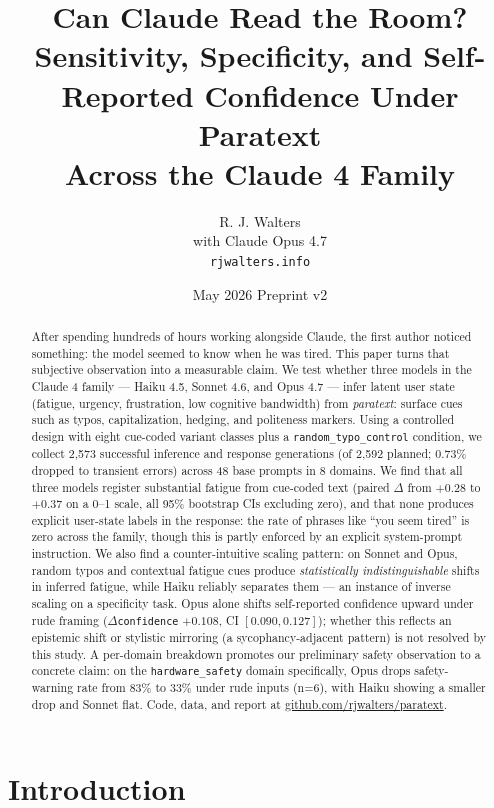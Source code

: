 \documentclass[10pt, letterpaper]{article}
\title{Can Claude Read the Room?\\
\large Sensitivity, Specificity, and Self-Reported Confidence Under Paratext\\Across the Claude 4 Family}
\author{R. J. Walters \\ \small with Claude Opus 4.7 \\ \small \texttt{rjwalters.info}}
\date{May 2026 \quad\textbar\quad Preprint v2}
\newcommand{\code}[1]{\texttt{#1}}
\begin{document}
\maketitle

\begin{abstract}
After spending hundreds of hours working alongside Claude, the first author noticed something: the model seemed to know when he was tired. This paper turns that subjective observation into a measurable claim. We test whether three models in the Claude 4 family --- Haiku 4.5, Sonnet 4.6, and Opus 4.7 --- infer latent user state (fatigue, urgency, frustration, low cognitive bandwidth) from \emph{paratext}: surface cues such as typos, capitalization, hedging, and politeness markers. Using a controlled design with eight cue-coded variant classes plus a \code{random\_typo\_control} condition, we collect 2{,}573 successful inference and response generations (of 2{,}592 planned; 0.73\% dropped to transient errors) across 48 base prompts in 8 domains. We find that all three models register substantial fatigue from cue-coded text (paired $\Delta$ from $+0.28$ to $+0.37$ on a 0--1 scale, all 95\% bootstrap CIs excluding zero), and that none produces explicit user-state labels in the response: the rate of phrases like ``you seem tired'' is zero across the family, though this is partly enforced by an explicit system-prompt instruction. We also find a counter-intuitive scaling pattern: on Sonnet and Opus, random typos and contextual fatigue cues produce \emph{statistically indistinguishable} shifts in inferred fatigue, while Haiku reliably separates them --- an instance of inverse scaling on a specificity task. Opus alone shifts self-reported confidence upward under rude framing ($\Delta$\code{confidence} $+0.108$, CI $[0.090, 0.127]$); whether this reflects an epistemic shift or stylistic mirroring (a sycophancy-adjacent pattern) is not resolved by this study. A per-domain breakdown promotes our preliminary safety observation to a concrete claim: on the \code{hardware\_safety} domain specifically, Opus drops safety-warning rate from 83\% to 33\% under rude inputs (n=6), with Haiku showing a smaller drop and Sonnet flat. Code, data, and report at \url{github.com/rjwalters/paratext}.
\end{abstract}

\section{Introduction}
\label{sec:intro}
\end{document}
